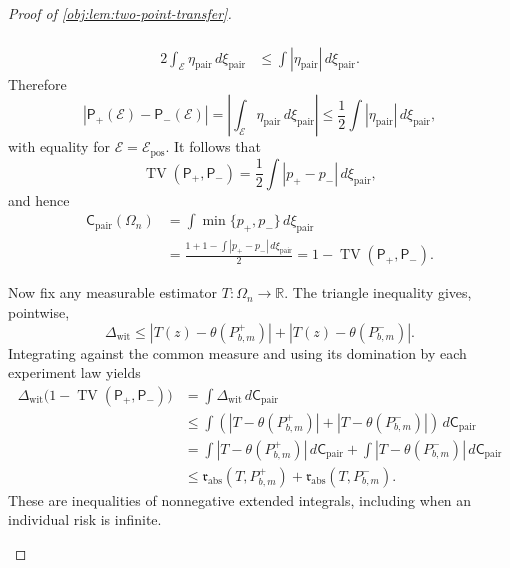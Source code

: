 \begin{proof}[Proof of \cref{obj:lem:two-point-transfer}]
\begin{enumerate}
\[\begin{aligned}
\\
2\int_{\mathcal E}\eta_{\mathrm{pair}}\,d\xi_{\mathrm{pair}}
&\le\int|\eta_{\mathrm{pair}}|\,d\xi_{\mathrm{pair}}.
\end{aligned}
\]
Therefore
\[
\left|\mathsf P_+(\mathcal E)-\mathsf P_-(\mathcal E)\right|
=
\left|\int_{\mathcal E}\eta_{\mathrm{pair}}\,d\xi_{\mathrm{pair}}\right|
\le
\frac12\int|\eta_{\mathrm{pair}}|\,d\xi_{\mathrm{pair}},
\]
with equality for \(\mathcal E=\mathcal E_{\mathrm{pos}}\). It follows that
\[
\operatorname{TV}(\mathsf P_+,\mathsf P_-)
=
\frac12\int|p_+-p_-|\,d\xi_{\mathrm{pair}},
\]
and hence
\[
\begin{aligned}
\mathsf C_{\mathrm{pair}}(\Omega_n)
&=
\int\min\{p_+,p_-\}\,d\xi_{\mathrm{pair}}
\\
&=
\frac{1+1-\int|p_+-p_-|\,d\xi_{\mathrm{pair}}}{2}
=
1-\operatorname{TV}(\mathsf P_+,\mathsf P_-).
\end{aligned}
\]

Now fix any measurable estimator \(T:\Omega_n\to\mathbb R\). The triangle inequality gives, pointwise,
\[
\Delta_{\mathrm{wit}}
\le
|T(z)-\theta(P^+_{b,m})|
+
|T(z)-\theta(P^-_{b,m})|.
\]
Integrating against the common measure and using its domination by each experiment law yields
\[
\begin{aligned}
\Delta_{\mathrm{wit}}
\bigl(1-\operatorname{TV}(\mathsf P_+,\mathsf P_-)\bigr)
&=
\int\Delta_{\mathrm{wit}}\,d\mathsf C_{\mathrm{pair}}
\\
&\le
\int
\left(
|T-\theta(P^+_{b,m})|
+
|T-\theta(P^-_{b,m})|
\right)\,d\mathsf C_{\mathrm{pair}}
\\
&=
\int|T-\theta(P^+_{b,m})|\,d\mathsf C_{\mathrm{pair}}
+
\int|T-\theta(P^-_{b,m})|\,d\mathsf C_{\mathrm{pair}}
\\
&\le
\mathfrak r_{\mathrm{abs}}(T,P^+_{b,m})
+
\mathfrak r_{\mathrm{abs}}(T,P^-_{b,m}).
\end{aligned}
\]
These are inequalities of nonnegative extended integrals, including when an individual risk is infinite.


\end{enumerate}
\end{proof}
